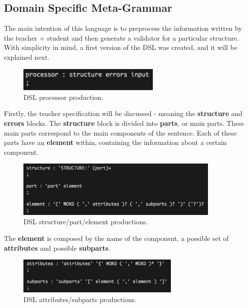 \subsection{Domain Specific Meta-Grammar}
The main intention of this language is to preprocess the information written by the teacher + student and then generate a validator for a particular structure. With simplicity in mind, a first version of the \textsc{DSL} was created, and it will be explained next.

\begin{figure}[h]
    \centering
    \includegraphics[width=7cm]{images/META_processor.png}
    \caption{DSL processor production.}
    \label{fig:dsl_processor_production}
\end{figure}

Firstly, the teacher specification will be discussed - meaning the \textbf{structure} and \textbf{errors} blocks.
The \textbf{structure} block is divided into \textbf{parts}, or main parts. These main parts correspond to the main components of the sentence. Each of these parts have an \textbf{element} within, containing the information about a certain component.

\begin{figure}[h]
    \centering
    \includegraphics[width=10cm]{images/META_structure.png}
    \caption{DSL structure/part/element productions.}
    \label{fig:dsl_structure_production}
\end{figure}

The \textbf{element} is composed by the name of the component, a possible set of \textbf{attributes} and possible \textbf{subparts}.

\begin{figure}[h]
    \centering
    \includegraphics[width=8cm]{images/META_attributes_subparts.png}
    \caption{DSL attributes/subparts productions.}
    \label{fig:dsl_attributes_production}
\end{figure}

